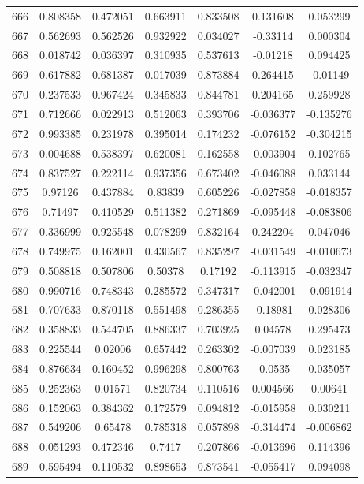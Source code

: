 \begin{table}
\begin{tabular}{c|c|c|c|c|c|c}
666 & 0.808358 & 0.472051 & 0.663911 & 0.833508 & 0.131608 & 0.053299\\
667 & 0.562693 & 0.562526 & 0.932922 & 0.034027 & -0.33114 & 0.000304\\
668 & 0.018742 & 0.036397 & 0.310935 & 0.537613 & -0.01218 & 0.094425\\
669 & 0.617882 & 0.681387 & 0.017039 & 0.873884 & 0.264415 & -0.01149\\
670 & 0.237533 & 0.967424 & 0.345833 & 0.844781 & 0.204165 & 0.259928\\
671 & 0.712666 & 0.022913 & 0.512063 & 0.393706 & -0.036377 & -0.135276\\
672 & 0.993385 & 0.231978 & 0.395014 & 0.174232 & -0.076152 & -0.304215\\
673 & 0.004688 & 0.538397 & 0.620081 & 0.162558 & -0.003904 & 0.102765\\
674 & 0.837527 & 0.222114 & 0.937356 & 0.673402 & -0.046088 & 0.033144\\
675 & 0.97126 & 0.437884 & 0.83839 & 0.605226 & -0.027858 & -0.018357\\
676 & 0.71497 & 0.410529 & 0.511382 & 0.271869 & -0.095448 & -0.083806\\
677 & 0.336999 & 0.925548 & 0.078299 & 0.832164 & 0.242204 & 0.047046\\
678 & 0.749975 & 0.162001 & 0.430567 & 0.835297 & -0.031549 & -0.010673\\
679 & 0.508818 & 0.507806 & 0.50378 & 0.17192 & -0.113915 & -0.032347\\
680 & 0.990716 & 0.748343 & 0.285572 & 0.347317 & -0.042001 & -0.091914\\
681 & 0.707633 & 0.870118 & 0.551498 & 0.286355 & -0.18981 & 0.028306\\
682 & 0.358833 & 0.544705 & 0.886337 & 0.703925 & 0.04578 & 0.295473\\
683 & 0.225544 & 0.02006 & 0.657442 & 0.263302 & -0.007039 & 0.023185\\
684 & 0.876634 & 0.160452 & 0.996298 & 0.800763 & -0.0535 & 0.035057\\
685 & 0.252363 & 0.01571 & 0.820734 & 0.110516 & 0.004566 & 0.00641\\
686 & 0.152063 & 0.384362 & 0.172579 & 0.094812 & -0.015958 & 0.030211\\
687 & 0.549206 & 0.65478 & 0.785318 & 0.057898 & -0.314474 & -0.006862\\
688 & 0.051293 & 0.472346 & 0.7417 & 0.207866 & -0.013696 & 0.114396\\
689 & 0.595494 & 0.110532 & 0.898653 & 0.873541 & -0.055417 & 0.094098\\

\end{tabular}
\end{table}
